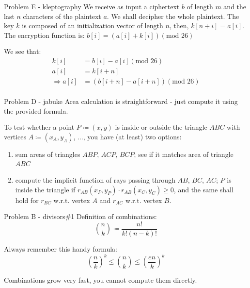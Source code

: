 \documentclass[compress]{beamer}
\begin{document}
\begin{frame}{Problem E - kleptography}
    We receive as input a ciphertext $b$ of length $m$ and the last $n$ characters of the plaintext $a$. We shall decipher the whole plaintext.
    The key $k$ is composed of an initialization vector of length $n$, then, $k[n + i] = a[i]$.
    The encryption function is: $b[i] = (a[i] + k[i]) (\text{mod } 26)$

    \bigskip
    We see that:
    \begin{align*}
        k[i]             & = b[i] - a[i] (\text{mod } 26)           \\
        a[i]             & = k[i + n]                               \\
        \Rightarrow a[i] & = (b[i + n] - a[i + n]) (\text{mod } 26) \\
    \end{align*}
\end{frame}

\begin{frame}{Problem D - jabuke}
    Area calculation is straightforward - just compute it using the provided formula.

    To test whether a point $P \coloneqq (x, y)$ is inside or outside the triangle $ABC$ with vertices $A \coloneqq (x_A, y_A)$, $\dots$, you have (at least) two options:
    \begin{enumerate}
        \item sum areas of triangles $ABP$, $ACP$, $BCP$; see if it matches area of triangle $ABC$
        \item compute the implicit function of rays passing through $AB$, $BC$, $AC$; $P$ is inside the triangle if $r_{AB}(x_P, y_P) \cdot r_{AB}(x_C, y_C) \geq 0$, and the same shall hold for $r_{BC}$ w.r.t. vertex $A$ and $r_{AC}$ w.r.t. vertex $B$.
    \end{enumerate}
\end{frame}

\begin{frame}{Problem B - divisors}{\#1}
    Definition of combinations:
    \begin{equation*}
        \binom{n}{k} \coloneqq \frac{n!}{k! (n - k)!}
    \end{equation*}

    Always remember this handy formula:
    \begin{equation*}
        \left (\frac{n}{k} \right )^k \leq \binom{n}{k} \leq \left ( \frac{en}{k} \right ) ^k
    \end{equation*}

    Combinations grow very fast, you cannot compute them directly.
\end{frame}
\end{document}
